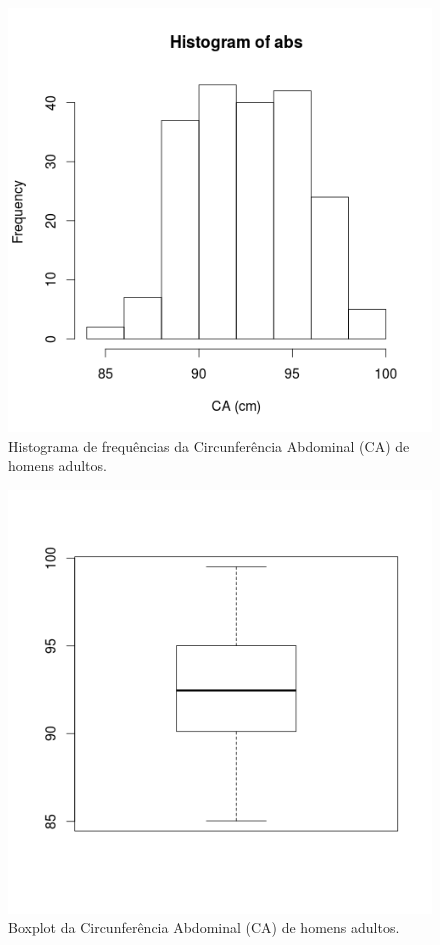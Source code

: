 \documentclass[a4paper]{article}
\begin{document}
\begin{figure}[h]
  \centering
  \includegraphics[width=.5\textwidth]{histograma}
  \caption{Histograma de frequências da Circunferência Abdominal (CA)
    de homens adultos.}
  \label{fig:histograma}
\end{figure}

\begin{figure}[h]
  \centering
  \includegraphics[width=.5\textwidth]{boxplot}
  \caption{Boxplot da Circunferência Abdominal (CA) de homens
    adultos.}
  \label{fig:boxplot}
\end{figure}
\end{document}
